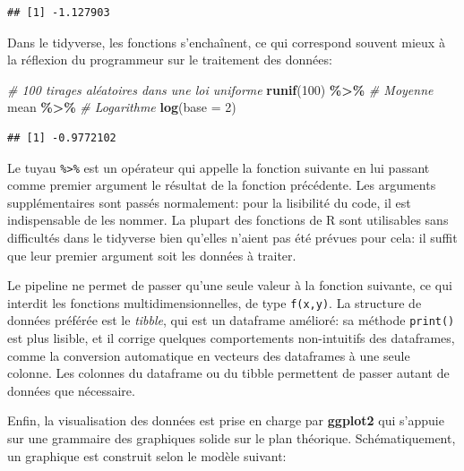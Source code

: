 \documentclass[
  12pt,
  french,
  a4paper,
  extrafontsizes,onecolumn,openright
  ]{memoir}
\newenvironment{Shaded}{\begin{snugshade}}{\end{snugshade}}
\newcommand{\AttributeTok}[1]{\textcolor[rgb]{0.13,0.29,0.53}{#1}}
\newcommand{\CommentTok}[1]{\textcolor[rgb]{0.56,0.35,0.01}{\textit{#1}}}
\newcommand{\DecValTok}[1]{\textcolor[rgb]{0.00,0.00,0.81}{#1}}
\newcommand{\FunctionTok}[1]{\textcolor[rgb]{0.13,0.29,0.53}{\textbf{#1}}}
\newcommand{\NormalTok}[1]{#1}
\newcommand{\SpecialCharTok}[1]{\textcolor[rgb]{0.81,0.36,0.00}{\textbf{#1}}}
\begin{document}
\begin{verbatim}
## [1] -1.127903
\end{verbatim}

\normalsize

Dans le tidyverse, les fonctions s'enchaînent, ce qui correspond souvent mieux à la réflexion du programmeur sur le traitement des données:

\scriptsize

\begin{Shaded}
\begin{Highlighting}[]
\CommentTok{\# 100 tirages aléatoires dans une loi uniforme}
\FunctionTok{runif}\NormalTok{(}\DecValTok{100}\NormalTok{) }\SpecialCharTok{\%\textgreater{}\%} 
  \CommentTok{\# Moyenne}
\NormalTok{  mean }\SpecialCharTok{\%\textgreater{}\%} 
  \CommentTok{\# Logarithme}
  \FunctionTok{log}\NormalTok{(}\AttributeTok{base =} \DecValTok{2}\NormalTok{)}
\end{Highlighting}
\end{Shaded}

\begin{verbatim}
## [1] -0.9772102
\end{verbatim}

\normalsize

Le tuyau \texttt{\%\textgreater{}\%} est un opérateur qui appelle la fonction suivante en lui passant comme premier argument le résultat de la fonction précédente.
Les arguments supplémentaires sont passés normalement: pour la lisibilité du code, il est indispensable de les nommer.
La plupart des fonctions de R sont utilisables sans difficultés dans le tidyverse bien qu'elles n'aient pas été prévues pour cela: il suffit que leur premier argument soit les données à traiter.

Le pipeline ne permet de passer qu'une seule valeur à la fonction suivante, ce qui interdit les fonctions multidimensionnelles, de type \texttt{f(x,y)}.
La structure de données préférée est le \emph{tibble}, qui est un dataframe amélioré: sa méthode \texttt{print()} est plus lisible, et il corrige quelques comportements non-intuitifs des dataframes, comme la conversion automatique en vecteurs des dataframes à une seule colonne.
Les colonnes du dataframe ou du tibble permettent de passer autant de données que nécessaire.

Enfin, la visualisation des données est prise en charge par \textbf{ggplot2} qui s'appuie sur une grammaire des graphiques \autocite{Wickham2010} solide sur le plan théorique.
Schématiquement, un graphique est construit selon le modèle suivant:
\end{document}
